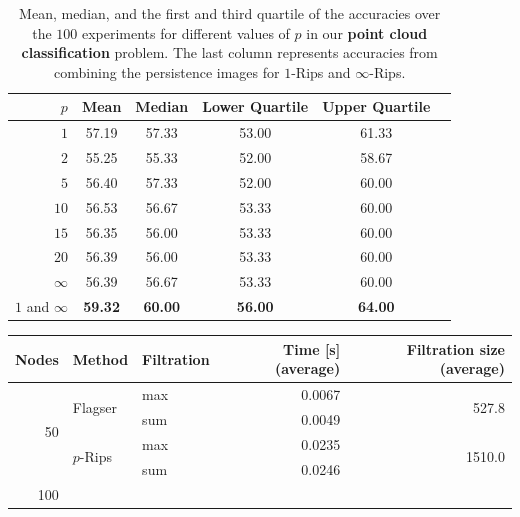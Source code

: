 \documentclass[a4paper,11pt]{article}
\theoremstyle{remark}
\begin{document}
\begin{appendices}
\begin{table}[ht]
\centering
\begin{tabular}{@{}rccccc@{}}
\toprule
\textbf{$p$} & \textbf{Mean} & \textbf{Median} & \textbf{Lower Quartile} & \textbf{Upper Quartile} \\ \midrule
$1$ & 57.19 & 57.33 & 53.00 & 61.33 \\
$2$ & 55.25 & 55.33 & 52.00 & 58.67 \\
$5$ & 56.40 & 57.33 & 52.00 & 60.00 \\
$10$ & 56.53 & 56.67 & 53.33 & 60.00 \\
$15$ & 56.35 & 56.00 & 53.33 & 60.00 \\
$20$ & 56.39 & 56.00 & 53.33 & 60.00 \\
$\infty$ & 56.39 & 56.67 & 53.33 & 60.00 \\
$1$ and $\infty$ & \textbf{59.32} & \textbf{60.00} & \textbf{56.00} & \textbf{64.00} \\
\bottomrule
\end{tabular}
\caption{Mean, median, and the first and third quartile of the accuracies over the $100$ experiments for different values of $p$ in our \textbf{point cloud classification} problem. The last column represents accuracies from combining the persistence images for $1$-Rips and $\infty$-Rips.}
\label{table:accuracies_point_clouds_different_p}
\end{table}

\begin{table}[ht]
\centering
\begin{tabular}{r l l r r}
\toprule
\textbf{Nodes} & \textbf{Method} & \textbf{Filtration} & \textbf{Time [s] (average)} & \textbf{Filtration size (average)} \\
\midrule
\multirow{4}{*}{50}
 & \multirow{2}{*}{Flagser} & max & 0.0067 & \multirow{2}{*}{527.8} \\
 &                           & sum & 0.0049 &                         \\

 & \multirow{2}{*}{$p$-Rips} & max & 0.0235 & \multirow{2}{*}{1510.0} \\
 &                           & sum & 0.0246 &                         \\
\midrule
\multirow{4}{*}{100}


\end{tabular}
\end{table}
\end{appendices}
\end{document}
